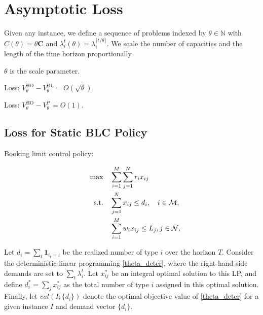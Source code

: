 \section{Asymptotic Loss}


Given any instance, we define a sequence of problems indexed by $\theta \in \mathbb{N}$ with $C(\theta) = \theta \bm{C}$ and $\lambda_{i}^{t}(\theta) = \lambda_{i}^{\lceil t/\theta \rceil}$. We scale the number of capacities and the length of the time horizon proportionally.

$\theta$ is the scale parameter.


\begin{prop}
    Loss: $V_{\theta}^{\text{HO}} - V_{\theta}^{\text{BL}} = O(\sqrt{\theta})$. 
\end{prop}

\begin{prop}
    Loss: $V_{\theta}^{\text{HO}} - V_{\theta}^{\text{P}} = O(1)$. 
\end{prop}



\subsection{Loss for Static BLC Policy}
Booking limit control policy:

\begin{align}
    \quad \max \quad & \sum_{i=1}^{M}  \sum_{j= 1}^{N} r_{i} x_{ij} \label{theta_deter} \\
    \text {s.t.} \quad & \sum_{j= 1}^{N} x_{ij} \leq d_{i}, \quad i \in \mathcal{M}, \notag \\ 
    & \sum_{i=1}^{M} w_{i} x_{ij} \leq L_j, j \in \mathcal{N}, \notag 
\end{align}


Let $d_{i} =\sum_{t} \bm{1}_{i_{t} = i}$ be the realized number of type $i$ over the horizon $T$. 
Consider the deterministic linear programming \eqref{theta_deter}, where the right-hand side demands are set to $\sum_{t} \lambda_{i}^{t}$. Let $x_{ij}^{*}$ be an integral optimal solution to this LP, and define $d_{i}^{*} = \sum_{j} x_{ij}^{*}$ as the total number of type $i$ assigned in this optimal solution. Finally, let $val(I; \{d_{i}\})$ denote the optimal objective value of \eqref{theta_deter} for a given instance $I$ and demand vector $\{d_{i}\}$.

